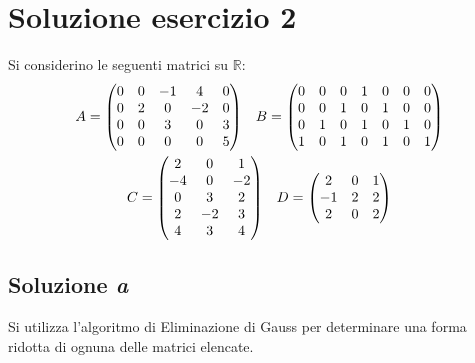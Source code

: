\documentclass[a4paper]{article}
\makeatletter
\newenvironment{rowequmat}[1]{\left(\array{@{}#1@{}}}{\endarray\right)}
\makeatother
\begin{document}
	\section{Soluzione esercizio 2}
	
	Si considerino le seguenti matrici su $\mathbb{R}$:
	\begin{gather*}
		A = \begin{rowequmat}{ccccc}
			0 & 0 & -1 & 4 & 0 \\
			0 & 2 & 0 & -2 & 0 \\
			0 & 0 & 3 & 0 & 3 \\
			0 & 0 & 0 & 0 & 5
		\end{rowequmat} \hspace{1em}
		B = \begin{rowequmat}{ccccccc}
			0 & 0 & 0 & 1 & 0 & 0 & 0 \\
			0 & 0 & 1 & 0 & 1 & 0 & 0 \\
			0 & 1 & 0 & 1 & 0 & 1 & 0 \\
			1 & 0 & 1 & 0 & 1 & 0 & 1
		\end{rowequmat} \\
		C = \begin{rowequmat}{ccc}
			2 & 0 & 1 \\
			-4 & 0 & -2 \\
			0 & 3 & 2 \\
			2 & -2 & 3 \\
			4 & 3 & 4
		\end{rowequmat} \hspace{1em}
		D = \begin{rowequmat}{ccc}
			2 & 0 & 1 \\
			-1 & 2 & 2 \\
			2 & 0 & 2
		\end{rowequmat}
	\end{gather*}
	
	\subsection{Soluzione \emph{a}}
	
	Si utilizza l'algoritmo di Eliminazione di Gauss per determinare una forma ridotta di ognuna delle matrici elencate.\newline
	
\end{document}
